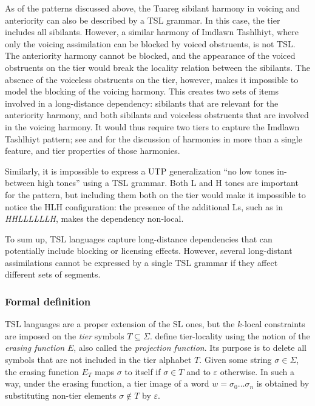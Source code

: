 As of the patterns discussed above, the Tuareg sibilant harmony in voicing and anteriority can also be described by a TSL grammar.
In this case, the tier includes all sibilants.
However, a similar harmony of Imdlawn Tashlhiyt, where only the voicing assimilation can be blocked by voiced obstruents, is not TSL.
The anteriority harmony cannot be blocked, and the appearance of the voiced obstruents on the tier would break the locality relation between the sibilants.
The absence of the voiceless obstruents on the tier, however, makes it impossible to model the blocking of the voicing harmony.
This creates two sets of items involved in a long-distance dependency: sibilants that are relevant for the anteriority harmony, and both sibilants and voiceless obstruents that are involved in the voicing harmony.
It would thus require two tiers to capture the Imdlawn Tashlhiyt pattern; see \cite{McMullin2016} and \cite{AksenovaDeshmukh2018} for the discussion of harmonies in more than a single feature, and tier properties of those harmonies.

Similarly, it is impossible to express a UTP generalization ``no low tones in-between high tones'' using a TSL grammar.
Both L and H tones are important for the pattern, but including them both on the tier would make it impossible to notice the HLH configuration: the presence of the additional Ls, such as in \emph{HHLLLLLLH}, makes the dependency non-local.


To sum up, TSL languages capture long-distance dependencies that can potentially include blocking or licensing effects.
However, several long-distant assimilations cannot be expressed by a single TSL grammar if they affect different sets of segments.

\subsubsection{Formal definition}

TSL languages are a proper extension of the SL ones, but the $k$-local constraints are imposed on the \emph{tier} symbols $T \subseteq \Sigma$.
\cite{DeSantoGraf19FG} define tier-locality using the notion of the \emph{erasing function} $E$, also called the \emph{projection function}.
Its purpose is to delete all symbols that are not included in the tier alphabet $T$.
Given some string $\sigma \in \Sigma$, the erasing function $E_{T}$ maps $\sigma$ to itself if $\sigma \in T$ and to $\varepsilon$ otherwise.
In such a way, under the erasing function, a tier image of a word $w = \sigma_0\dots\sigma_n$ is obtained by substituting non-tier elements $\sigma \not\in T$ by $\varepsilon$.


